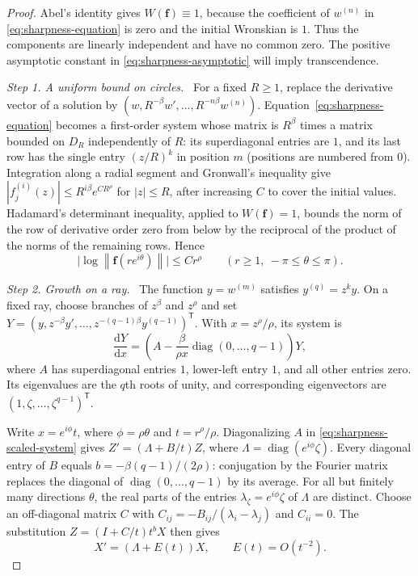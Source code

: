 \documentclass[11pt,letterpaper,reqno]{amsart}
\theoremstyle{remark}
\numberwithin{equation}{section}
\newcommand{\norm}[1]{\left\lVert#1\right\rVert}
\newcommand{\fv}{\bm f}
\newcommand{\step}[1]{\medskip\noindent\emph{#1}\ }
\begin{document}
\begin{proof}
Abel's identity gives $W(\fv)\equiv1$, because the coefficient of
$w^{(n)}$ in \eqref{eq:sharpness-equation} is zero and the initial
Wronskian is $1$. Thus the components are linearly independent and have
no common zero. The positive asymptotic constant in
\eqref{eq:sharpness-asymptotic} will imply transcendence.

\step{Step 1. A uniform bound on circles.}
For a fixed $R\geq1$, replace the derivative vector of a solution by
$(w,R^{-\beta}w',\ldots,R^{-n\beta}w^{(n)})$.
Equation~\eqref{eq:sharpness-equation} becomes a first-order system whose
matrix is $R^\beta$ times a matrix bounded on $D_R$ independently of $R$:
its superdiagonal entries are $1$, and its last row has the single
entry $(z/R)^k$ in position $m$ (positions are numbered from $0$).
Integration along a radial segment and Gronwall's inequality give
$|f_j^{(i)}(z)|\leq R^{i\beta}e^{CR^\rho}$ for $|z|\leq R$,
after increasing $C$ to cover the initial values.
Hadamard's determinant inequality, applied to $W(\fv)=1$, bounds the
norm of the row of derivative order zero from below by the reciprocal of the
product of the norms of the remaining rows. Hence
\begin{equation}\label{eq:sharpness-domination}
 \bigl|\log\norm{\fv(re^{i\theta})}\bigr|\leq C r^\rho
 \qquad(r\geq1,\ -\pi\leq\theta\leq\pi).
\end{equation}

\step{Step 2. Growth on a ray.}
The function $y=w^{(m)}$ satisfies $y^{(q)}=z^ky$.
On a fixed ray, choose branches of $z^\beta$ and $z^\rho$ and set
$Y=(y,z^{-\beta}y',\ldots,z^{-(q-1)\beta}y^{(q-1)})^{\mathsf T}$.
With $x=z^\rho/\rho$, its system is
\begin{equation}\label{eq:sharpness-scaled-system}
 \frac{\mathrm dY}{\mathrm dx}
 =\left(A-\frac{\beta}{\rho x}\operatorname{diag}(0,\ldots,q-1)\right)Y,
\end{equation}
where $A$ has superdiagonal entries $1$, lower-left entry $1$, and all
other entries zero. Its eigenvalues are the $q$th roots of unity, and
corresponding eigenvectors are $(1,\zeta,\ldots,\zeta^{q-1})^{\mathsf T}$.

Write $x=e^{i\phi}t$, where $\phi=\rho\theta$ and $t=r^\rho/\rho$.
Diagonalizing $A$ in \eqref{eq:sharpness-scaled-system} gives
$Z'=(\Lambda+B/t)Z$, where
$\Lambda=\operatorname{diag}(e^{i\phi}\zeta)$.
Every diagonal entry of $B$ equals
$b=-\beta(q-1)/(2\rho)$: conjugation by the Fourier matrix replaces
the diagonal of $\operatorname{diag}(0,\ldots,q-1)$ by its average.
For all but finitely many directions $\theta$, the real parts of the
entries $\lambda_\zeta=e^{i\phi}\zeta$ of $\Lambda$ are distinct.
Choose an off-diagonal matrix $C$ with
$C_{ij}=-B_{ij}/(\lambda_i-\lambda_j)$ and $C_{ii}=0$.
The substitution $Z=(I+C/t)t^bX$ then gives
\begin{equation}\label{eq:sharpness-integrable-system}
 X'=(\Lambda+E(t))X,\qquad E(t)=O(t^{-2}).
\end{equation}


\end{proof}
\end{document}
